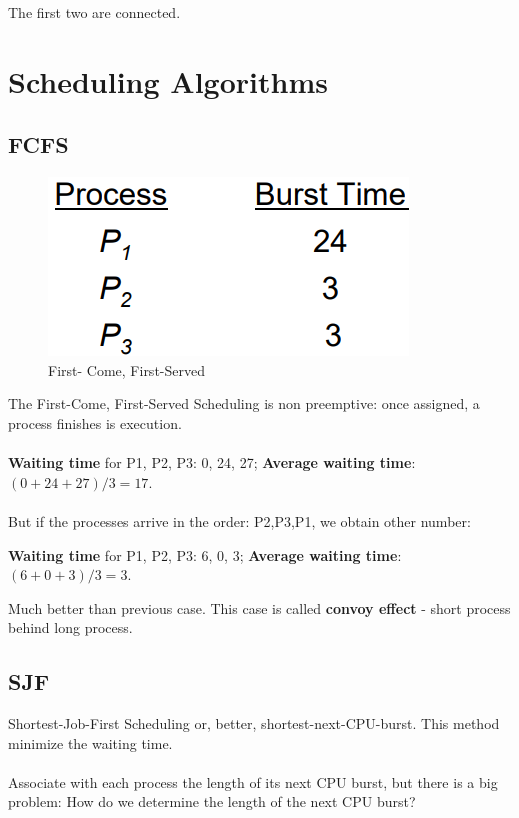 The first two are connected. 

\newpage
\section{Scheduling Algorithms}

\subsection{FCFS}

\begin{figure}[htbp]
    \centering
    \includegraphics[width=0.25\linewidth]{img/FCFS.png}
    \caption{First- Come, First-Served}    
\end{figure}

The First-Come, First-Served Scheduling is non preemptive: once assigned, a process finishes is
execution.

\paragraph{}

\textbf{Waiting time} for P1, P2, P3: 0, 24, 27;
\textbf{Average waiting time}: $(0 + 24 + 27)/3 = 17$.

\paragraph{}
But if the processes arrive in the order: P2,P3,P1, we obtain other number:

\textbf{Waiting time} for P1, P2, P3: 6, 0, 3;
\textbf{Average waiting time}: $(6 + 0 + 3)/3 = 3$.

Much better than previous case. This case is called \textbf{convoy effect} - short process behind long process.

\subsection{SJF}
Shortest-Job-First Scheduling or, better, shortest-next-CPU-burst. This method minimize the waiting time.

\paragraph{}
Associate with each process the length of its next CPU burst, but there is a big problem: How do we determine the length of the next CPU burst?


